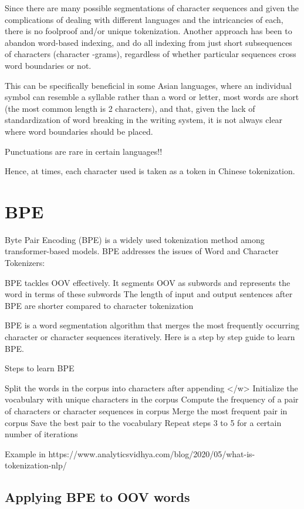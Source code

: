 Since there are many possible segmentations of character sequences and given the complications of dealing with different languages and the intricancies of each, there is no foolproof and/or unique tokenization. Another approach has been to abandon word-based indexing, and do all indexing from just short subsequences of characters (character -grams), regardless of whether particular sequences cross word boundaries or not.

This can be specifically beneficial in some Asian languages, where an individual symbol can resemble a syllable rather than a word or letter,  most words are short (the most common length is 2 characters), and that, given the lack of standardization of word breaking in the writing system, it is not always clear where word boundaries should be placed.

Punctuations are rare in certain languages!!

Hence, at times, each character used is taken as a token in Chinese tokenization.

\section{BPE}

Byte Pair Encoding (BPE) is a widely used tokenization method among transformer-based models. BPE addresses the issues of Word and Character Tokenizers:

    BPE tackles OOV effectively. It segments OOV as subwords and represents the word in terms of these subwords
    The length of input and output sentences after BPE are shorter compared to character tokenization

BPE is a word segmentation algorithm that merges the most frequently occurring character or character sequences iteratively. Here is a step by step guide to learn BPE.

Steps to learn BPE

    Split the words in the corpus into characters after appending </w>
    Initialize the vocabulary with unique characters in the corpus
    Compute the frequency of a pair of characters or character sequences in corpus
    Merge the most frequent pair in corpus
    Save the best pair to the vocabulary
    Repeat steps 3 to 5 for a certain number of iterations

Example in https://www.analyticsvidhya.com/blog/2020/05/what-is-tokenization-nlp/

\subsection{Applying BPE to OOV words}

